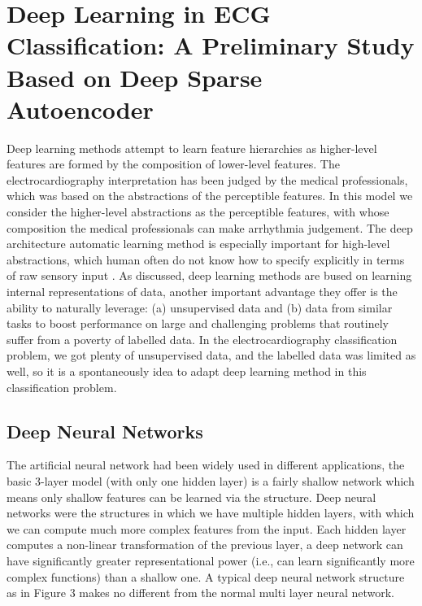 \documentclass[graybox]{svmult}
\begin{document}
\section{Deep Learning in ECG Classification: A Preliminary Study Based on Deep Sparse Autoencoder}
Deep learning methods attempt to learn feature hierarchies as higher-level features are formed by the composition of lower-level features. The electrocardiography interpretation has been judged by the medical professionals, which was based on the abstractions of the perceptible features. In this model we consider the higher-level abstractions as the perceptible features, with whose composition the medical professionals can make arrhythmia judgement. The deep architecture automatic learning method is especially important for high-level abstractions, which human often do not know how to specify explicitly in terms of raw sensory input \citep{erhan}. As \citep{collobert} discussed, deep learning methods are bused on learning internal representations of data, another important advantage they offer is the ability to naturally leverage: (a) unsupervised data and (b) data from similar tasks to boost performance on large and challenging problems that routinely suffer from a poverty of labelled data. In the electrocardiography classification problem, we got plenty of unsupervised data, and the labelled data was limited as well, so it is a spontaneously idea to adapt deep learning method in this classification problem. 

\subsection{Deep Neural Networks}
The artificial neural network had been widely used in different applications, the basic 3-layer model (with only one hidden layer) is a fairly shallow network which means only shallow features can be learned via the structure. Deep neural networks were the structures in which we have multiple hidden layers, with which we can compute much more complex features from the input. Each hidden layer computes a non-linear transformation of the previous layer, a deep network can have significantly greater representational power (i.e., can learn significantly more complex functions) than a shallow one. A typical deep neural network structure as in Figure 3 makes no different from the normal multi layer neural network.
\end{document}

